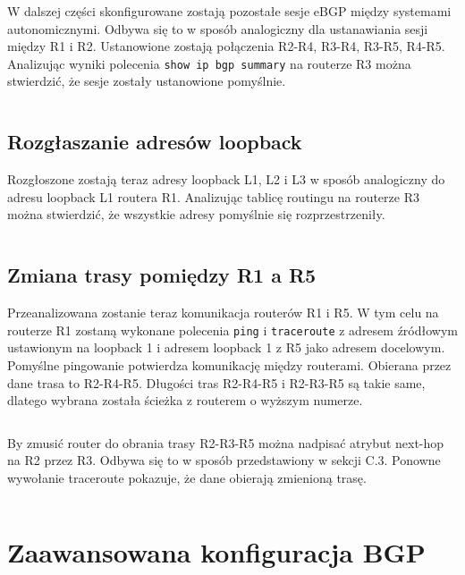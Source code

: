 \documentclass[a4paper,12pt,notitlepage]{article}
\begin{document}
W dalszej części skonfigurowane zostają pozostałe sesje eBGP między systemami autonomicznymi. Odbywa się to w sposób analogiczny dla ustanawiania sesji między R1 i R2. Ustanowione zostają połączenia R2-R4, R3-R4, R3-R5, R4-R5. Analizując wyniki polecenia \texttt{show ip bgp summary} na routerze R3 można stwierdzić, że sesje zostały ustanowione pomyślnie.
\inputminted[label=Rezultat polecenia show ip bgp summary na R3, firstline=806, lastline=821]{text}{Routers/R3.txt}%

\subsection{Rozgłaszanie adresów loopback}

Rozgłoszone zostają teraz adresy loopback L1, L2 i L3 w sposób analogiczny do adresu loopback L1 routera R1. Analizując tablicę routingu na routerze R3 można stwierdzić, że wszystkie adresy pomyślnie się rozprzestrzeniły.
\inputminted[label=Tablica routingu na R3 po rozgłoszeniu loopbacków, firstline=891, lastline=916]{text}{Routers/R3.txt}%

\subsection{Zmiana trasy pomiędzy R1 a R5}

Przeanalizowana zostanie teraz komunikacja routerów R1 i R5. W tym celu na routerze R1 zostaną wykonane polecenia \texttt{ping} i \texttt{traceroute} z adresem źródłowym ustawionym na loopback 1 i adresem loopback 1 z R5 jako adresem docelowym. Pomyślne pingowanie potwierdza komunikację między routerami. Obierana przez dane trasa to R2-R4-R5. Długości tras R2-R4-R5 i R2-R3-R5 są takie same, dlatego wybrana została ścieżka z routerem o wyższym numerze.
\inputminted[label=Komunikacja między R1 i R5, firstline=316, lastline=330]{text}{Routers/R1.txt}%

By zmusić router do obrania trasy R2-R3-R5 można nadpisać atrybut next-hop na R2 przez R3. Odbywa się to w sposób przedstawiony w sekcji C.3. Ponowne wywołanie traceroute pokazuje, że dane obierają zmienioną trasę.
\inputminted[label=Komunikacja między R1 i R5 po zmianie next-hop, firstline=331, lastline=338]{text}{Routers/R1.txt}%

\section{Zaawansowana konfiguracja BGP}
\end{document}
